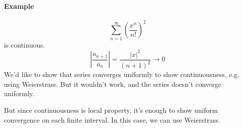 \paragraph{Example}
$$\sum_{n=1}^{\infty} \left(\frac{x^n}{n!}\right)^2$$
is continuous.
$$\left| \frac{a_{n+1}}{a_n}\right| = \frac{|x|^2}{(n+1)^2} \to 0$$
We'd like to show that series converges uniformly to show continuousness, e.g. using Weierstrass. But it wouldn't work, and the series doesn't converge uniformly.

But since continuousness is local property, it's enough to show uniform convergence on each finite interval. In this case, we can use Weierstrass.